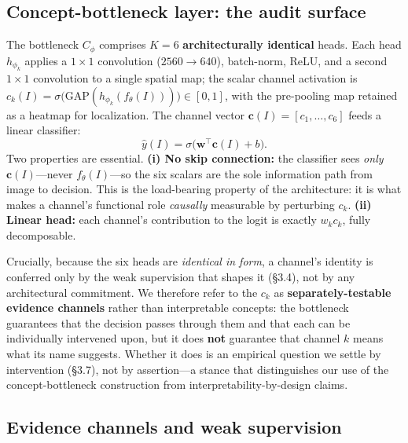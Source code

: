 \subsection{Concept-bottleneck layer: the audit surface}

The bottleneck \(C_\phi\) comprises \(K{=}6\) \textbf{architecturally identical} heads. Each head \(h_{\phi_k}\) applies a \(1\times1\) convolution (\(2560\to640\)), batch-norm, ReLU, and a second \(1\times1\) convolution to a single spatial map; the scalar channel activation is \(c_k(I)=\sigma\big(\mathrm{GAP}(h_{\phi_k}(f_\theta(I)))\big)\in[0,1]\), with the pre-pooling map retained as a heatmap for localization. The channel vector \(\mathbf{c}(I)=[c_1,\dots,c_6]\) feeds a linear classifier: \[\hat{y}(I)=\sigma\big(\mathbf{w}^\top\mathbf{c}(I)+b\big).\] Two properties are essential. \textbf{(i) No skip connection:} the classifier sees \emph{only} \(\mathbf{c}(I)\)---never \(f_\theta(I)\)---so the six scalars are the sole information path from image to decision. This is the load-bearing property of the architecture: it is what makes a channel's functional role \emph{causally} measurable by perturbing \(c_k\). \textbf{(ii) Linear head:} each channel's contribution to the logit is exactly \(w_k c_k\), fully decomposable.

Crucially, because the six heads are \emph{identical in form}, a channel's identity is conferred only by the weak supervision that shapes it (\S{}3.4), not by any architectural commitment. We therefore refer to the \(c_k\) as \textbf{separately-testable evidence channels} rather than interpretable concepts: the bottleneck guarantees that the decision passes through them and that each can be individually intervened upon, but it does \textbf{not} guarantee that channel \(k\) means what its name suggests. Whether it does is an empirical question we settle by intervention (\S{}3.7), not by assertion---a stance that distinguishes our use of the concept-bottleneck construction \citep{koh2020concept} from interpretability-by-design claims.

\subsection{Evidence channels and weak supervision}

